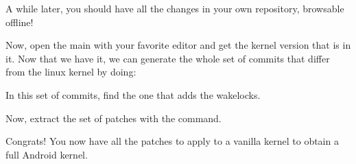 A while later, you should have all the changes in your own repository, browsable
offline!

Now, open the main  with your favorite editor and get the kernel version
that is in it. Now that we have it, we can generate the whole set of commits that
differ from the linux kernel by doing:


In this set of commits, find the one that adds the wakelocks.

Now, extract the set of patches with the  command.

Congrats! You now have all the patches to apply to a vanilla kernel to obtain a
full Android kernel.
